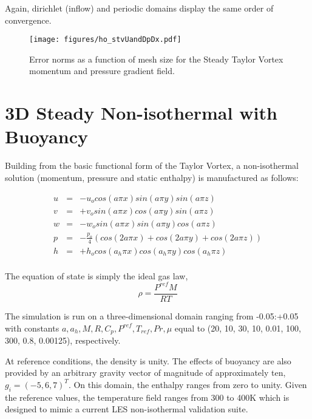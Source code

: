 Again, dirichlet (inflow) and periodic domains display the same order of convergence.

\begin{figure}
\centerline{\texttt{[image: figures/ho\_stvUandDpDx.pdf]}}
\caption{Error norms as a function of mesh size for the Steady Taylor Vortex momentum and pressure gradient field.}
\label{fig:hoSTVMMS}
\end{figure}

\section{3D Steady Non-isothermal with Buoyancy}

Building from the basic functional form of the Taylor Vortex,
a non-isothermal solution (momentum, pressure and static enthalpy)
is manufactured as follows:

\begin{eqnarray}
  u &=& -u_o cos(a \pi x) sin(a \pi y ) sin(a \pi z) \nonumber \\
  v &=& +v_o sin(a \pi x) cos(a \pi y ) sin(a \pi z) \nonumber \\
  w &=& -w_o sin(a \pi x) sin(a \pi y ) cos(a \pi z) \nonumber \\
  p &=& -\frac{p_o}{4}( cos(2 a \pi x) + cos(2 a \pi y ) + cos(2 a \pi z) )  \nonumber \\
  h &=& +h_o cos(a_h \pi x) cos(a_h \pi y ) cos(a_h \pi z)  \nonumber \\
\label{3dNonIso}
\end{eqnarray}

The equation of state is simply the ideal gas law, 
\begin{equation}
  \rho = \frac{P^{ref} M}{R T}
\label{idealGasEOS}
\end{equation}

The simulation is run on a three-dimensional domain ranging from -0.05:+0.05 with
constants $a, a_h, M, R, C_p, P^{ref}, T_{ref}, Pr, \mu$ equal to 
(20, 10, 30, 10, 0.01, 100, 300, 0.8, 0.00125), respectively.

At reference conditions, the density is unity. The effects of buoyancy are also provided 
by an arbitrary gravity vector of magnitude of approximately ten, $g_i = (-5, 6, 7)^T$. On this domain, 
the enthalpy ranges from zero to unity. Given the reference values, the temperature 
field ranges from 300 to 400K which is designed to mimic a current LES non-isothermal 
validation suite.

